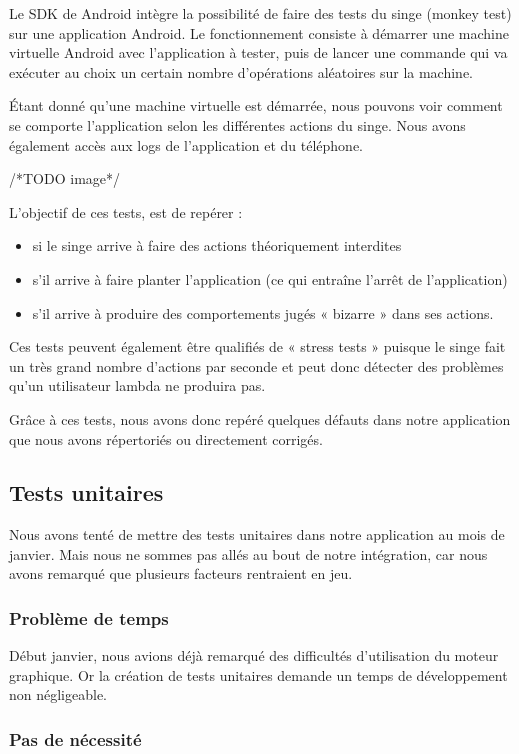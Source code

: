 \documentclass{report}
\begin{document}
Le SDK de Android intègre la possibilité de faire des tests du singe (monkey test) sur une application Android. Le fonctionnement consiste à démarrer une machine virtuelle Android avec l’application à tester, puis de lancer une commande qui va exécuter au choix un certain nombre d’opérations aléatoires sur la machine.

Étant donné qu’une machine virtuelle est démarrée, nous pouvons voir comment se comporte l’application selon les différentes actions du singe. Nous avons également accès aux logs de l’application et du téléphone.

/*TODO image*/

L’objectif de ces tests, est de repérer :
\begin{itemize}
\item si le singe arrive à faire des actions théoriquement interdites
\item s’il arrive à faire planter l’application (ce qui entraîne l’arrêt de l’application)
\item s’il arrive à produire des comportements jugés « bizarre » dans ses actions.
\end{itemize}
Ces tests peuvent également être qualifiés de « stress tests » puisque le singe fait un très grand nombre d’actions par seconde et peut donc détecter des problèmes qu’un utilisateur lambda ne produira pas.

Grâce à ces tests, nous avons donc repéré quelques défauts dans notre application que nous avons répertoriés ou directement corrigés.

\subsection{Tests unitaires}

Nous avons tenté de mettre des tests unitaires dans notre application au mois de janvier. Mais nous ne sommes pas allés au bout de notre intégration, car nous avons remarqué que plusieurs facteurs rentraient en jeu.

\subsubsection{Problème de temps}

Début janvier, nous avions déjà remarqué des difficultés d’utilisation du moteur graphique. Or la création de tests unitaires demande un temps de développement non négligeable.

\subsubsection{Pas de nécessité}
\end{document}

